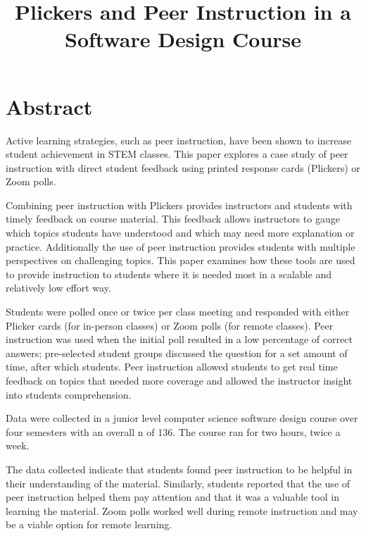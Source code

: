 \documentclass[12pt]{article}
\title{\large \textbf{Plickers and Peer Instruction in a Software Design Course}} %
\author{\normalsize}
\date{} %
\newcommand\sampleSize{136}
\begin{document}
\maketitle
\thispagestyle{empty}
\pagestyle{empty}

\section*{Abstract}
Active learning strategies, such as peer instruction, have been shown to increase student achievement in STEM classes.  This  paper explores a case study of peer instruction with direct student feedback using printed response cards (Plickers) or Zoom polls.

Combining peer instruction with Plickers provides instructors and students with timely feedback on course material.  This feedback allows instructors to gauge which topics students have understood and which may need more explanation or practice.  Additionally the use of peer instruction provides students with multiple perspectives on challenging topics.  This paper examines how these tools are used to provide instruction to students where it is needed most in a scalable and relatively low effort way.  

Students were polled once or twice per class meeting and responded with either Plicker cards (for in-person classes) or Zoom polls (for remote classes). Peer instruction was used  when the initial poll resulted in a low percentage of correct answers; pre-selected student groups  discussed the question for a set amount of time, after which students.  Peer instruction allowed students to get real time feedback on topics that needed more coverage and allowed the instructor insight into students comprehension.

Data were collected in a junior level computer science software design course over four semesters with an overall n of \sampleSize. The course ran for two hours, twice a week. 

The data collected indicate that students found peer instruction to be helpful in their understanding of the material.  Similarly, students reported that the use of peer instruction helped them pay attention and that it was a valuable tool in learning the material.  Zoom polls worked well during remote instruction and may be a viable option for remote learning.  
\end{document}
